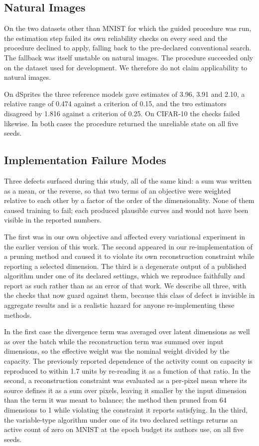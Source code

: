 \documentclass[make,article,submit,pdftex,moreauthors]{Definitions/mdpi}
\begin{document}
\subsection{Natural Images}\label{sec:res_natural}

On the two datasets other than MNIST for which the guided procedure was
run, the estimation step failed its own reliability checks on every seed
and the procedure declined to apply, falling back to the pre-declared
conventional search. The fallback was itself unstable on natural images.
The procedure succeeded only on the dataset used for development. We
therefore do not claim applicability to natural images.

On dSprites the three reference models gave estimates of 3.96, 3.91 and
2.10, a relative range of 0.474 against a criterion of 0.15, and the two
estimators disagreed by 1.816 against a criterion of 0.25. On CIFAR-10 the
checks failed likewise. In both cases the procedure returned the
unreliable state on all five seeds.

\subsection{Implementation Failure Modes}\label{sec:res_failures}

Three defects surfaced during this study, all of the same kind: a sum was
written as a mean, or the reverse, so that two terms of an objective were
weighted relative to each other by a factor of the order of the
dimensionality. None of them caused training to fail; each produced
plausible curves and would not have been visible in the reported numbers.

The first was in our own objective and affected every variational
experiment in the earlier version of this work. The second appeared in our
re-implementation of a pruning method and caused it to violate its own
reconstruction constraint while reporting a selected dimension. The third
is a degenerate output of a published algorithm under one of its declared
settings, which we reproduce faithfully and report as such rather than as
an error of that work. We describe all three, with the checks that now
guard against them, because this class of defect is invisible in
aggregate results and is a realistic hazard for anyone re-implementing
these methods.

In the first case the divergence term was averaged over latent dimensions
as well as over the batch while the reconstruction term was summed over
input dimensions, so the effective weight was the nominal weight divided
by the capacity. The previously reported dependence of the activity count
on capacity is reproduced to within 1.7 units by re-reading it as a
function of that ratio. In the second, a reconstruction constraint was
evaluated as a per-pixel mean where its source defines it as a sum over
pixels, leaving it smaller by the input dimension than the term it was
meant to balance; the method then pruned from 64 dimensions to 1 while
violating the constraint it reports satisfying. In the third, the
variable-type algorithm under one of its two declared settings returns an
active count of zero on MNIST at the epoch budget its authors use, on all
five seeds.
\end{document}

